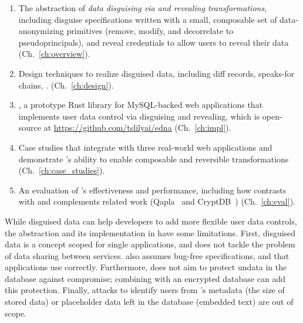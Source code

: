 \begin{enumerate}[nosep]
    \item The abstraction of \emph{data disguising via \xxing and revealing
        transformations}, including 
        disguise specifications written with a small, composable set of
        data-anonymizing primitives (remove, modify, and decorrelate to
        pseudoprincipals), and reveal credentials to allow users
        to reveal their data (Ch.~\ref{ch:overview}).

    \item Design techniques to realize disguised data, including diff records,
        speaks-for chains, .
        (Ch.~\ref{ch:design}).

    \item \sys, a prototype Rust library for MySQL-backed web applications that
        implements user data control via disguising and revealing, which is
        open-source at
        \url{https://github.com/tslilyai/edna} (Ch.~\ref{ch:impl}).

    \item Case studies that integrate \sys with three real-world web
    applications and demonstrate \sys's ability to enable composable and
        reversible transformations (Ch.~\ref{ch:case_studies}).

    \item An evaluation of \sys's effectiveness and performance, including how
    \sys contrasts with and complements related work (Qapla~\cite{qapla} and
        CryptDB~\cite{cryptdb}) (Ch.~\ref{ch:eval}).
\end{enumerate}
%

%
While disguised data can help developers to add more flexible user data
controls, the abstraction and its implementation in \sys have some limitations. 
%
First, disguised data is a concept scoped for single applications, and does not
tackle the problem of data sharing between services.
%
%
\sys also assumes bug-free \xx specifications, and that applications use \sys
correctly.
%
Furthermore, \sys does not aim to protect un\xxed data in the database against compromise;
combining \sys with an encrypted database can add this protection.
%
Finally, attacks to identify users from \sys's metadata (\eg the size of
stored \xxed data) or placeholder data left in the database (\eg embedded text)
are out of scope.
%



